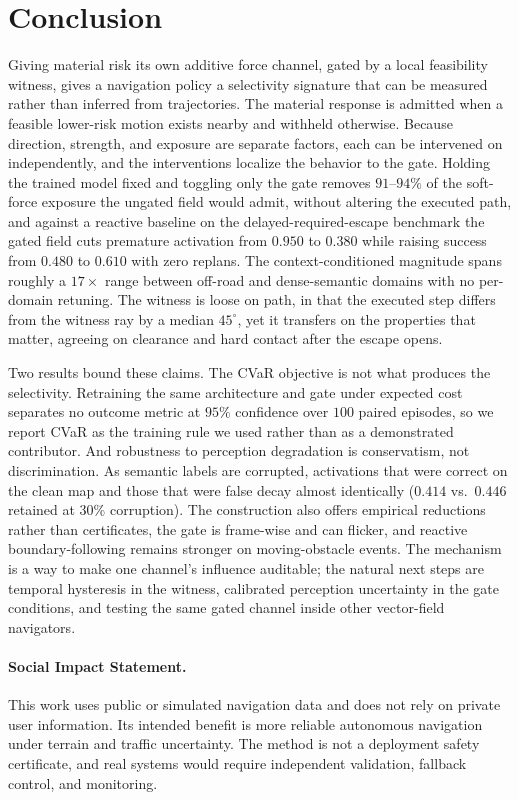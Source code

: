 \documentclass{article}
\theoremstyle{definition}
\begin{document}
\section{Conclusion}
\label{sec:conclusion}

Giving material risk its own additive force channel, gated by a local feasibility
witness, gives a navigation policy a selectivity signature that can be measured
rather than inferred from trajectories. The material response is admitted when
a feasible lower-risk motion exists nearby and withheld otherwise. Because
direction, strength, and exposure are separate factors, each can be intervened on
independently, and the interventions localize the behavior to the gate. Holding
the trained model fixed and toggling only the gate removes $91$--$94\%$ of the
soft-force exposure the ungated field would admit, without altering the executed
path, and against a reactive
baseline on the delayed-required-escape benchmark the gated field cuts premature
activation from $0.950$ to $0.380$ while raising success from $0.480$ to $0.610$
with zero replans. The context-conditioned magnitude spans roughly a
$17{\times}$ range between off-road and dense-semantic domains with no
per-domain retuning. The witness is loose on path, in that the executed step
differs from the witness ray by a median $45^\circ$, yet it transfers on the
properties that matter, agreeing on clearance and hard contact after the escape
opens.

Two results bound these claims. The CVaR objective is not what produces the
selectivity. Retraining the same architecture and gate under expected cost
separates no outcome metric at $95\%$ confidence over $100$ paired episodes, so
we report CVaR as the training rule we used rather than as a demonstrated
contributor. And robustness to perception degradation is conservatism, not
discrimination. As semantic labels are corrupted, activations that were correct
on the clean map and those that were false decay almost identically
($0.414$ vs.\ $0.446$ retained at $30\%$ corruption). The construction also
offers empirical reductions rather than certificates, the gate is frame-wise and
can flicker, and reactive boundary-following remains stronger on
moving-obstacle events. The mechanism is a way to make one channel's influence
auditable; the natural next steps are temporal hysteresis in the witness,
calibrated perception uncertainty in the gate conditions, and testing the same
gated channel inside other vector-field navigators.


\paragraph{Social Impact Statement.}
This work uses public or simulated navigation data and does not rely on private user information. Its intended benefit is more reliable autonomous navigation under terrain and traffic uncertainty. The method is not a deployment safety certificate, and real systems would require independent validation, fallback control, and monitoring.
\end{document}
